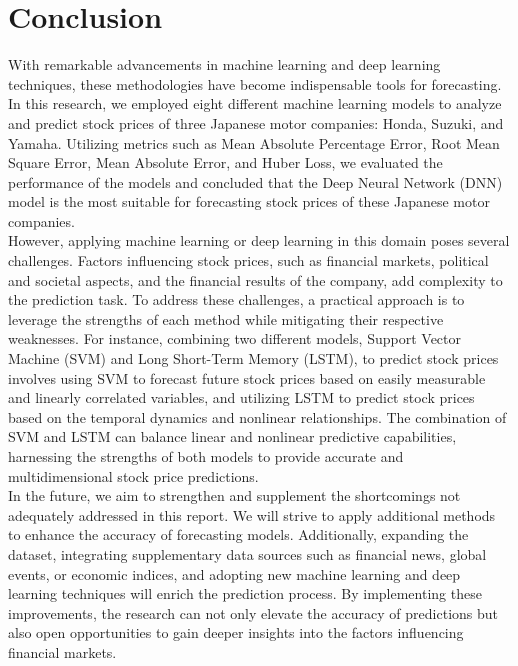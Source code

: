 \documentclass{ieeeojies}
\begin{document}
\section{Conclusion}
With remarkable advancements in machine learning and deep learning techniques, these methodologies have become indispensable tools for forecasting. In this research, we employed eight different machine learning models to analyze and predict stock prices of three Japanese motor companies: Honda, Suzuki, and Yamaha. Utilizing metrics such as Mean Absolute Percentage Error, Root Mean Square Error, Mean Absolute Error, and Huber Loss, we evaluated the performance of the models and concluded that the Deep Neural Network (DNN) model is the most suitable for forecasting stock prices of these Japanese motor companies.\\
However, applying machine learning or deep learning in this domain poses several challenges. Factors influencing stock prices, such as financial markets, political and societal aspects, and the financial results of the company, add complexity to the prediction task. To address these challenges, a practical approach is to leverage the strengths of each method while mitigating their respective weaknesses. For instance, combining two different models, Support Vector Machine (SVM) and Long Short-Term Memory (LSTM), to predict stock prices involves using SVM to forecast future stock prices based on easily measurable and linearly correlated variables, and utilizing LSTM to predict stock prices based on the temporal dynamics and nonlinear relationships. The combination of SVM and LSTM can balance linear and nonlinear predictive capabilities, harnessing the strengths of both models to provide accurate and multidimensional stock price predictions.\\
In the future, we aim to strengthen and supplement the shortcomings not adequately addressed in this report. We will strive to apply additional methods to enhance the accuracy of forecasting models. Additionally, expanding the dataset, integrating supplementary data sources such as financial news, global events, or economic indices, and adopting new machine learning and deep learning techniques will enrich the prediction process. By implementing these improvements, the research can not only elevate the accuracy of predictions but also open opportunities to gain deeper insights into the factors influencing financial markets.
\end{document}
